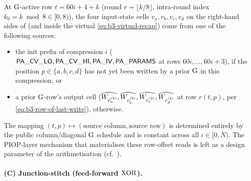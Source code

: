 \begin{remark}
\label{rem:b3-state-access-rows}
At $\operatorname{G}$-active row $t = 60i + 4 + k$ (round $r = \lfloor k/8 \rfloor$,
intra-round index $k_0 = k \bmod 8 \in [0, 8)$), the four
input-state cells $v_a, v_b, v_c, v_d$ on the right-hand sides of
 (and inside the virtual
\eqref{eq:b3-virtual-recap}) come from one of the following sources:
\begin{itemize}[leftmargin=2em,topsep=2pt]
  \item the init prefix of compression $i$ ($\mathsf{PA\_CV\_LO},
        \mathsf{PA\_CV\_HI}, \mathsf{PA\_IV}, \mathsf{PA\_PARAMS}$ at rows
        $60i, \dots, 60i + 3$), if the position $p \in \{a,b,c,d\}$
        has not yet been written by a prior $\operatorname{G}$ in this
        compression; or
  \item a prior $\operatorname{G}$-row's output cell
        ($\widehat{W_{v_a^{(2)}}}, \widehat{W_{v_b^{(2)}}}, \widehat{W_{v_c^{(2)}}},
        \widehat{W_{v_d^{(2)}}}$ at row $r(t, p)$, per
        \eqref{eq:b3-row-of-last-write}), otherwise.
\end{itemize}
The mapping $(t, p) \mapsto (\text{source column}, \text{source row})$
is determined entirely by the public column/diagonal $\operatorname{G}$ schedule
and is constant across all $i \in [0, N)$. The PIOP-layer mechanism
that materialises these row-offset reads is left as a design parameter
of the arithmetisation (cf.\ ).
\end{remark}


\paragraph{(C) Junction-stitch (feed-forward $\operatorname{XOR}$).}


